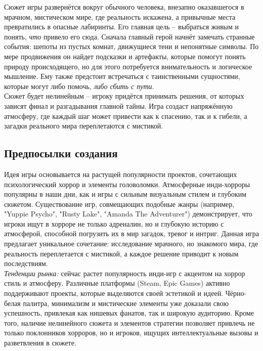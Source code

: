 \documentclass{article}
\begin{document}
	Сюжет игры развернётся вокруг обычного человека, внезапно оказавшегося в мрачном, мистическом мире, где реальность искажена, а привычные места превратились в опасные лабиринты. Его главная цель -- выбраться живым и понять, \textit{что} привело его сюда.   
	Сначала главный герой начнёт замечать странные события: шепоты из пустых комнат, движущиеся тени и непонятные символы. По мере продвижения он найдет подсказки и артефакты, которые помогут понять природу происходящего, но для этого потребуется внимательность и логическое мышление. Ему также предстоит встречаться с таинственными сущностями, которые могут либо помочь, \textit{либо сбить с пути}. \\
	
	Сюжет будет нелинейным -- игроку придётся принимать решения, от которых зависят финал и разгадывания главной тайны. Игра создаст напряжённую атмосферу, где каждый шаг может привести как к спасению, так и к гибели, а загадки реального мира переплетаются с мистикой. \\
	

	\newpage
	\subsection{Предпосылки создания}
	
	Идея игры основывается на растущей популярности проектов, сочетающих психологический хоррор и элементы головоломки. Атмосферные инди-хорроры популярны в наши дни, как и игры с сильным визуальным стилем и глубоким сюжетом. Существование игр, совмещающих подобные жанры (например, "Yuppie Psycho", "Rusty Lake", "Amanda The Adventurer") демонстрирует, что игроки ищут в хорроре не только адреналин, но и глубокую историю с атмосферой, способной погрузить их в мир загадок, тревог и интриг. Данная игра предлагает уникальное сочетание: исследование мрачного, но знакомого мира, где реальность переплетается с мистикой, а каждое решение приводит к новым последствиям. \\
	
	\textit{Тенденции рынка:} сейчас растет популярность инди-игр с акцентом на хоррор стиль и атмосферу. Различные платформы (Steam, Epic Games) активно поддерживают проекты, которые выделяются своей эстетикой и идеей. Чёрно-белая палитра, минимализм и мистические элементы уже доказали свою успешность, привлекая как нишевых фанатов, так и широкую аудиторию. Кроме того, наличие нелинейного сюжета и элементов стратегии позволяет привлечь не только поклонников хорроров, но и игроков, ищущих интеллектуальные вызовы и разветвления в сюжете.
	
\end{document}
